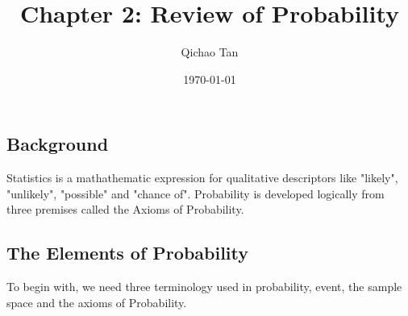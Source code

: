 \documentclass[working]{article}
\title{Chapter 2: Review of Probability}
\author{Qichao Tan}
\date{\today}
\begin{document}
\createintro


\subsection{Background}

Statistics is a mathathematic expression for qualitative descriptors like "likely", "unlikely", "possible" and "chance of". Probability is developed logically from three premises called the Axioms of Probability.

\subsection{The Elements of Probability}

To begin with, we need three terminology used in probability, event, the sample space and the axioms of Probability.
\end{document}

